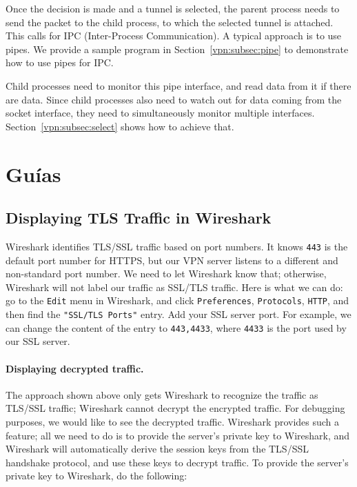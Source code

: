 Once the decision is made and a tunnel is selected, the parent process
needs to send the packet to the child process, to which
the selected tunnel is attached. This calls for IPC (Inter-Process Communication). A
typical approach is to use pipes. We provide a sample program in
Section~\ref{vpn:subsec:pipe} to demonstrate how to use pipes for IPC.


Child processes need to monitor this pipe interface, and read data from it if there 
are data. Since child processes also need to watch out for data coming from the socket
interface, they need to simultaneously monitor multiple interfaces.    
Section~\ref{vpn:subsec:select} shows how to achieve that. 




\section{Guías}



\subsection{Displaying TLS Traffic in Wireshark}

Wireshark identifies TLS/SSL traffic based on port numbers. It knows 
\texttt{443} is the default port number for HTTPS, but our VPN server listens to a different
and non-standard
port number. We need to let Wireshark know that; otherwise, Wireshark will not label our 
traffic as SSL/TLS traffic. Here is what we can do: 
go to the \texttt{Edit} menu in Wireshark, and 
click  \texttt{Preferences}, \texttt{Protocols}, \texttt{HTTP}, and 
then find the \texttt{"SSL/TLS Ports"} entry. Add your SSL
server port. For example, we can change the content 
of the entry to  \texttt{443,4433}, where \texttt{4433} is the port used by our SSL server. 


\paragraph{Displaying decrypted traffic.} The approach shown above only 
gets Wireshark to recognize the traffic as TLS/SSL traffic; Wireshark cannot 
decrypt the encrypted traffic. For debugging purposes, we would like to see the decrypted
traffic. Wireshark provides such a feature; all we need to do is to provide the 
server's private key to Wireshark, and Wireshark will automatically 
derive the session keys from the TLS/SSL handshake protocol, and use these
keys to decrypt traffic. To provide the server's private key
to Wireshark, do the following:


